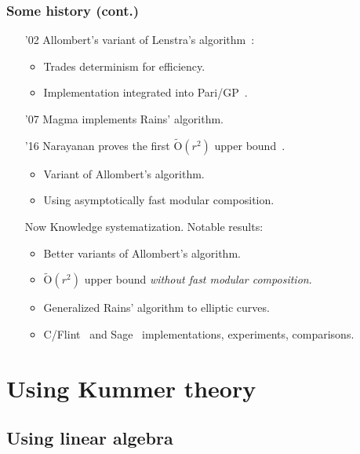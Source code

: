\documentclass[francais]{beamer}
\def\tildO {\ensuremath{\mathrm{\tilde{O}}}}
\begin{document}
\begin{frame}\frametitle{Some history (cont.)}
  \begin{enumerate}
    \item['02] Allombert's variant of Lenstra's algorithm~\cite{Allombert02,Allombert02-rev}:
      \begin{itemize}
      \item Trades determinism for efficiency.
      \item Implementation integrated into Pari/GP~\cite{Pari}.
      \end{itemize}
    \item['07] Magma implements Rains' algorithm.
    \item['16] Narayanan proves the first $\tildO(r^2)$ upper
      bound~\cite{narayanan2016fast}.
      \begin{itemize}
      \item Variant of Allombert's algorithm.
      \item Using asymptotically fast modular composition.
      \end{itemize}
    \item[Now] Knowledge systematization. Notable results:
      \begin{itemize}
      \item Better variants of Allombert's algorithm.
      \item $\tildO(r^2)$ upper bound \emph{without fast modular
          composition}.
      \item Generalized Rains' algorithm to elliptic curves.
      \item C/Flint~\cite{hart2010flint} and Sage~\cite{Sage} implementations, experiments, comparisons.
      \end{itemize}
    \end{enumerate}
  \end{frame}

\section{Using Kummer theory}

\subsection{Using linear algebra}
\end{document}
